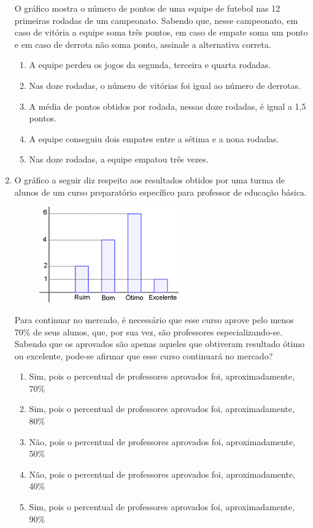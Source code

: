 \documentclass[twocolumn,oneside,a4paper,10pt]{article}
\begin{document}
\begin{enumerate}
O gráfico mostra o número de pontos de uma equipe de futebol nas 12 primeiras rodadas de um campeonato. Sabendo que, nesse campeonato, em caso de vitória a equipe soma três pontos, em caso de empate soma um ponto e em caso de derrota não soma ponto, assinale a alternativa correta.

\begin{enumerate}
\item A equipe perdeu os jogos da segunda, terceira e quarta rodadas.
\item Nas doze rodadas, o número de vitórias foi igual ao número de derrotas.
\item A média de pontos obtidos por rodada, nessas doze rodadas, é igual a 1,5 pontos.
\item A equipe conseguiu dois empates entre a sétima e a nona rodadas.
\item Nas doze rodadas, a equipe empatou três vezes.
\end{enumerate}

\item O gráfico a seguir diz respeito aos resultados obtidos por uma turma de alunos de um curso preparatório específico para professor de educação básica.

\begin{figure}[!htb]
\center
\includegraphics[width=6cm]{Figuras/g3.jpg}
\end{figure}

\newpage
Para continuar no mercado, é necessário que esse curso aprove pelo menos 70\% de seus alunos, que, por sua vez, são professores especializando-se. Sabendo que os aprovados são apenas aqueles que obtiveram resultado ótimo ou excelente, pode-se afirmar que esse curso continuará no mercado?

\begin{enumerate}
\item Sim, pois o percentual de professores aprovados foi, aproximadamente, 70\%
\item Sim, pois o percentual de professores aprovados foi, aproximadamente, 80\%
\item Não, pois o percentual de professores aprovados foi, aproximadamente, 50\%
\item Não, pois o percentual de professores aprovados foi, aproximadamente, 40\%
\item Sim, pois o percentual de professores aprovados foi, aproximadamente, 90\%
\end{enumerate}


\end{enumerate}
\end{document}

